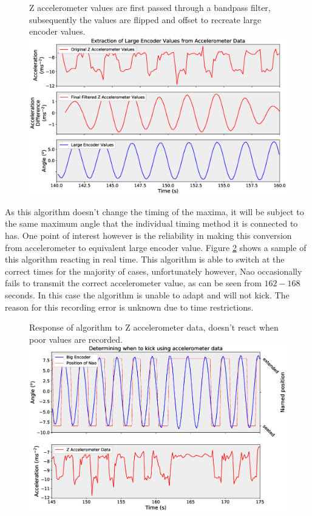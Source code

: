 \documentclass[11pt]{article}
\begin{document}
    \begin{figure}[!htb]
        \centering
        \captionbox
             {Z accelerometer values are first passed through a bandpass filter, subsequently the values are flipped and offset to recreate large encoder values.\label{fig:AccelerometerFiltering}}
             {\includegraphics[width=1.0\textwidth]{AccelerometerFiltering.eps}}
    \end{figure}
    
As this algorithm doesn't change the timing of the maxima, it will be subject to the same maximum angle that the individual timing method it is connected to has. One point of interest however is the reliability in making this conversion from accelerometer to equivalent large encoder value. Figure \ref{fig:PositionAccelerometer} shows a sample of this algorithm reacting in real time. This algorithm is able to switch at the correct times for the majority of cases, unfortunately however, Nao occasionally fails to transmit the correct accelerometer value, as can be seen from $162-168$seconds. In this case the algorithm is unable to adapt and will not kick. The reason for this recording error is unknown due to time restrictions.

    \begin{figure}[!htb]
        \centering
        \captionbox
             {Response of algorithm to Z accelerometer data, doesn't react when poor values are recorded.\label{fig:PositionAccelerometer}}
             {\includegraphics[width=1.0\textwidth]{PositionAccelerometer.eps}}
    \end{figure}
\clearpage
\end{document}
